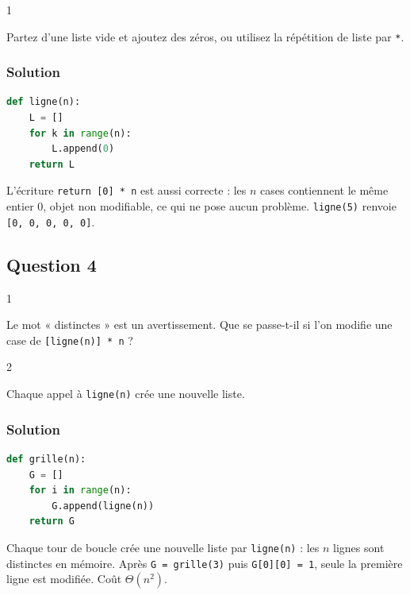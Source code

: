 \documentclass[11pt,a4paper]{article}
\begin{document}
\begin{indication}{1}

Partez d'une liste vide et ajoutez des zéros, ou utilisez la répétition de liste par \texttt{*}.

\end{indication}

\hypertarget{solution-2}{%
\subsubsection{Solution}\label{solution-2}}

\begin{lstlisting}[language=Python]
def ligne(n):
    L = []
    for k in range(n):
        L.append(0)
    return L
\end{lstlisting}

L'écriture \texttt{return\ {[}0{]}\ *\ n} est aussi correcte : les \(n\) cases contiennent le même entier 0, objet non modifiable, ce qui ne pose aucun problème. \texttt{ligne(5)} renvoie \texttt{{[}0,\ 0,\ 0,\ 0,\ 0{]}}.

\hypertarget{question-4}{%
\subsection{Question 4}\label{question-4}}

\begin{indication}{1}

Le mot « distinctes » est un avertissement. Que se passe-t-il si l'on modifie une case de \texttt{{[}ligne(n){]}\ *\ n} ?

\end{indication}

\begin{indication}{2}

Chaque appel à \texttt{ligne(n)} crée une nouvelle liste.

\end{indication}

\hypertarget{solution-3}{%
\subsubsection{Solution}\label{solution-3}}

\begin{lstlisting}[language=Python]
def grille(n):
    G = []
    for i in range(n):
        G.append(ligne(n))
    return G
\end{lstlisting}

Chaque tour de boucle crée une nouvelle liste par \texttt{ligne(n)} : les \(n\) lignes sont distinctes en mémoire. Après \texttt{G\ =\ grille(3)} puis \texttt{G{[}0{]}{[}0{]}\ =\ 1}, seule la première ligne est modifiée. Coût \(\Theta(n^2)\).
\end{document}
